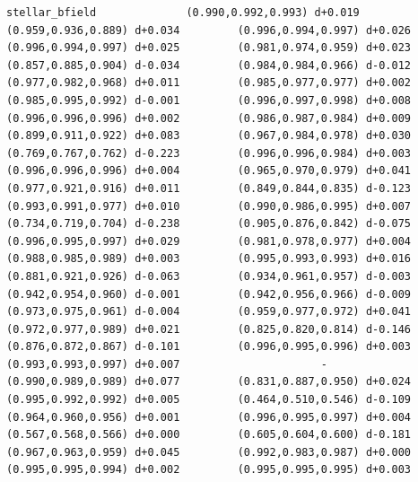 \documentclass[11pt, letterpaper, openany]{book}
\begin{document}
\begin{empiricalbox}
\begin{lstlisting}[style=terminal]
stellar_bfield              (0.990,0.992,0.993) d+0.019         (0.959,0.936,0.889) d+0.034         (0.996,0.994,0.997) d+0.026         (0.996,0.994,0.997) d+0.025         (0.981,0.974,0.959) d+0.023         (0.857,0.885,0.904) d-0.034         (0.984,0.984,0.966) d-0.012         (0.977,0.982,0.968) d+0.011         (0.985,0.977,0.977) d+0.002         (0.985,0.995,0.992) d-0.001         (0.996,0.997,0.998) d+0.008         (0.996,0.996,0.996) d+0.002         (0.986,0.987,0.984) d+0.009         (0.899,0.911,0.922) d+0.083         (0.967,0.984,0.978) d+0.030         (0.769,0.767,0.762) d-0.223         (0.996,0.996,0.984) d+0.003         (0.996,0.996,0.996) d+0.004         (0.965,0.970,0.979) d+0.041         (0.977,0.921,0.916) d+0.011         (0.849,0.844,0.835) d-0.123         (0.993,0.991,0.977) d+0.010         (0.990,0.986,0.995) d+0.007         (0.734,0.719,0.704) d-0.238         (0.905,0.876,0.842) d-0.075         (0.996,0.995,0.997) d+0.029         (0.981,0.978,0.977) d+0.004         (0.988,0.985,0.989) d+0.003         (0.995,0.993,0.993) d+0.016         (0.881,0.921,0.926) d-0.063         (0.934,0.961,0.957) d-0.003         (0.942,0.954,0.960) d-0.001         (0.942,0.956,0.966) d-0.009         (0.973,0.975,0.961) d-0.004         (0.959,0.977,0.972) d+0.041         (0.972,0.977,0.989) d+0.021         (0.825,0.820,0.814) d-0.146         (0.876,0.872,0.867) d-0.101         (0.996,0.995,0.996) d+0.003         (0.993,0.993,0.997) d+0.007                      -                      (0.990,0.989,0.989) d+0.077         (0.831,0.887,0.950) d+0.024         (0.995,0.992,0.992) d+0.005         (0.464,0.510,0.546) d-0.109         (0.964,0.960,0.956) d+0.001         (0.996,0.995,0.997) d+0.004         (0.567,0.568,0.566) d+0.000         (0.605,0.604,0.600) d-0.181         (0.967,0.963,0.959) d+0.045         (0.992,0.983,0.987) d+0.000         (0.995,0.995,0.994) d+0.002         (0.995,0.995,0.995) d+0.003     

\end{lstlisting}
\end{empiricalbox}
\end{document}
